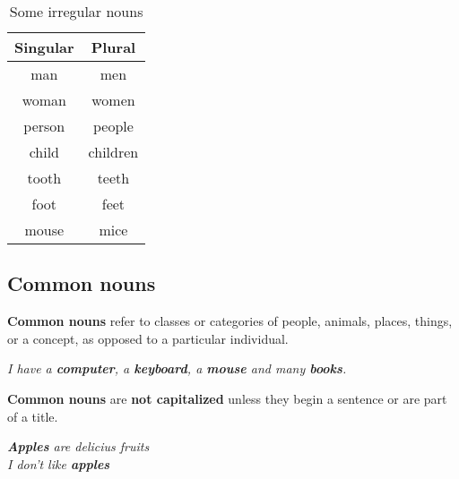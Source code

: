 \documentclass[hidelinks,10pt,a4paper]{article}
\begin{document}
\begin{table}[h]
\begin{center}
\begin{tabular}{|c|c|}
\hline
\textbf{Singular} & \textbf{Plural}\\
\hline
man & men\\ \hline
woman & women\\\hline
person & people\\\hline
child & children\\\hline
tooth & teeth\\\hline
foot & feet\\\hline
mouse & mice\\
\hline
\end{tabular}
\end{center}
\caption{\label{tab:nouns1}Some irregular nouns}
\end{table}


\subsection{Common nouns}
\textbf{Common nouns} refer to classes or categories of people, animals, places, things, or a concept, as opposed to a particular individual.
\begin{center}
	\textit{I have a \textbf{computer}, a \textbf{keyboard}, a \textbf{mouse} and many \textbf{books}. }
\end{center}
\indent
\textbf{Common nouns} are \textbf{not capitalized} unless they begin a sentence or are part of a title.
\begin{center}
		\textit{
		\textbf{Apples} are delicius fruits\\
				I don't like \textbf{apples} }
\end{center}
\end{document}
